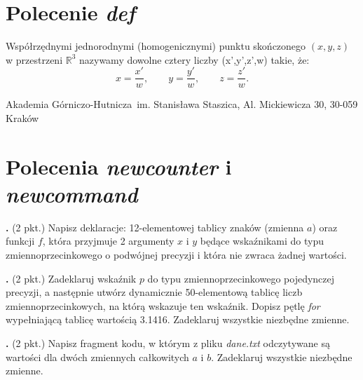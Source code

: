 \documentclass[a4paper,12pt,twoside]{article}
\def\R3{\mathbb{R}^3}
\def\AGH{Akademia Górniczo-Hutnicza}
\newcounter{zad}
\newcommand{\zadanie}{\addtocounter{zad}{1} \medskip \noindent \textbf{\thezad. }}
\begin{document}
\section{Polecenie \emph{def}}

Współrzędnymi jednorodnymi (homogenicznymi) punktu skończonego $(x,y,z)$ w przestrzeni $\R3$ nazywamy dowolne cztery liczby (x',y',z',w) takie, że:
$$x = \frac{x'}{w},\qquad y = \frac{y'}{w},\qquad z = \frac{z'}{w}.$$

\AGH~im. Stanisława Staszica, Al. Mickiewicza 30, 30-059 Kraków



\section{Polecenia \emph{newcounter} i \emph{newcommand}}

\zadanie (2 pkt.) Napisz deklaracje: 12-elementowej tablicy znaków (zmienna $a$) oraz funkcji $f$, która przyjmuje 2 argumenty $x$ i $y$ będące wskaźnikami do typu zmiennoprzecinkowego o podwójnej precyzji i która nie zwraca żadnej wartości.

\vspace{1mm} 

\dotfill \par \dotfill  

\vspace{1.5mm} 

\zadanie (2 pkt.) 
Zadeklaruj wskaźnik $p$ do typu zmiennoprzecinkowego pojedynczej precyzji, a następnie utwórz dynamicznie 50-elementową tablicę liczb zmiennoprzecinkowych, na którą wskazuje ten wskaźnik. Dopisz pętlę \emph{for} wypełniającą tablicę wartością 3.1416. Zadeklaruj wszystkie niezbędne zmienne.

\vspace{1mm}

\dotfill \par \dotfill \par \dotfill \par \dotfill \par \dotfill 

\vspace{1.5mm} 

\zadanie (2 pkt.) Napisz fragment kodu, w którym z pliku \emph{dane.txt} odczytywane są wartości dla dwóch zmiennych całkowitych $a$ i $b$. Zadeklaruj wszystkie niezbędne zmienne.

\vspace{1mm}
\end{document}
